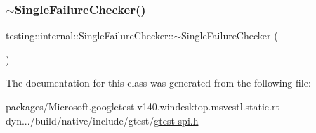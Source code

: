\mbox{\label{classtesting_1_1internal_1_1_single_failure_checker_a4b0a907c9c1b350c79d70af138e9f0bf}} 
\subsubsection{\texorpdfstring{$\sim$SingleFailureChecker()}{~SingleFailureChecker()}}
{\footnotesize\ttfamily testing\+::internal\+::\+Single\+Failure\+Checker\+::$\sim$\+Single\+Failure\+Checker (\begin{DoxyParamCaption}{ }\end{DoxyParamCaption})}



The documentation for this class was generated from the following file\+:\begin{DoxyCompactItemize}
\item 
packages/\+Microsoft.\+googletest.\+v140.\+windesktop.\+msvcstl.\+static.\+rt-\/dyn.../build/native/include/gtest/\mbox{\hyperlink{gtest-spi_8h}{gtest-\/spi.\+h}}\end{DoxyCompactItemize}
